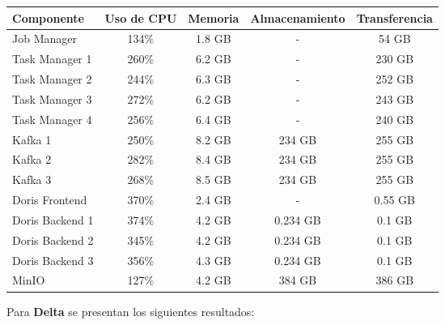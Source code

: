 \begin{longtable}{|p{3cm}|c|c|c|c|}
    \hline
    \textbf{Componente} & \textbf{Uso de CPU} & \textbf{Memoria} & \textbf{Almacenamiento} & \textbf{Transferencia} \\
    \hline
    Job Manager & 134\% & 1.8 GB & - & 54 GB \\
    \hline
    Task Manager 1 & 260\% & 6.2 GB & - & 230 GB \\
    \hline
    Task Manager 2 & 244\% & 6.3 GB & - & 252 GB \\
    \hline
    Task Manager 3 & 272\% & 6.2 GB & - & 243 GB \\
    \hline
    Task Manager 4 & 256\% & 6.4 GB & - & 240 GB \\
    \hline
    Kafka 1 & 250\% & 8.2 GB & 234 GB & 255 GB \\
    \hline
    Kafka 2 & 282\% & 8.4 GB & 234 GB & 255 GB \\
    \hline
    Kafka 3 & 268\% & 8.5 GB & 234 GB & 255 GB \\
    \hline
    Doris Frontend & 370\% & 2.4 GB & - & 0.55 GB \\
    \hline
    Doris Backend 1 & 374\% & 4.2 GB & 0.234 GB & 0.1 GB \\
    \hline
    Doris Backend 2 & 345\% & 4.2 GB & 0.234 GB & 0.1 GB \\
    \hline
    Doris Backend 3 & 356\% & 4.3 GB & 0.234 GB & 0.1 GB \\
    \hline
    MinIO & 127\% & 4.2 GB & 384 GB & 386 GB \\
    \hline
\end{longtable}

\newpage

Para \textbf{Delta} se presentan los siguientes resultados:

